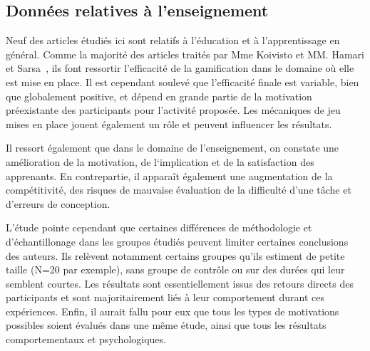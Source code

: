 \subsection{Données relatives à l'enseignement}
Neuf des articles étudiés ici sont relatifs à l'éducation et à l'apprentissage en général. Comme la majorité des articles traités par Mme Koivisto et MM. Hamari et Sarsa~\cite{gamif-review}, ils font ressortir l’efficacité de la gamification dans le domaine où elle est mise en place. Il est cependant soulevé que l'efficacité finale est variable, bien que globalement positive, et dépend en grande partie de la motivation préexistante des participants pour l’activité proposée. Les mécaniques de jeu mises en place jouent également un rôle et peuvent influencer les résultats. \par 

Il ressort également que dans le domaine de l’enseignement, on constate une amélioration de la motivation, de l‘implication et de la satisfaction des apprenants. En contrepartie, il apparaît également une augmentation de la compétitivité, des risques de mauvaise évaluation de la difficulté d’une tâche et d’erreurs de conception. \par

L'étude pointe cependant que certaines différences de méthodologie et d'échantillonage dans les groupes étudiés peuvent limiter certaines conclusions des auteurs. Ils relèvent notamment certains groupes qu'ils estiment de petite taille (N=20 par exemple), sans groupe de contrôle ou sur des durées qui leur semblent courtes. Les résultats sont essentiellement issus des retours directs des participants et sont majoritairement liés à leur comportement durant ces expériences. Enfin, il aurait fallu pour eux que tous les types de motivations possibles soient évalués dans une même étude, ainsi que tous les résultats comportementaux et psychologiques.
